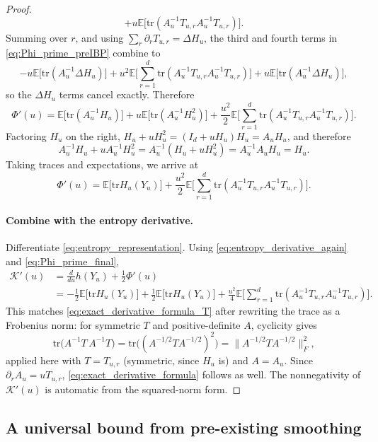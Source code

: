 \documentclass[11pt]{article}
\def\E{\mathbb{E}}
\newcommand{\tr}{\mathrm{tr}}
\begin{document}
\begin{proof}
\[+
 u\E\big[\tr(A_u^{-1}T_{u,r}A_u^{-1}T_{u,r})\big].
\]
Summing over \(r\), and using \(\sum_r \partial_r T_{u,r}=\Delta H_u\), the third and fourth terms in \eqref{eq:Phi_prime_preIBP} combine to
\[
-u\E\big[\tr(A_u^{-1}\Delta H_u)\big]
+
 u^2\E\Big[\sum_{r=1}^d \tr(A_u^{-1}T_{u,r}A_u^{-1}T_{u,r})\Big]
+
 u\E\big[\tr(A_u^{-1}\Delta H_u)\big],
\]
so the \(\Delta H_u\) terms cancel exactly. Therefore
\begin{equation}
\label{eq:Phi_prime_postIBP}
\Phi'(u)
=
\E\big[\tr(A_u^{-1}H_u)\big]
+
 u\E\big[\tr(A_u^{-1}H_u^2)\big]
+
 \frac{u^2}{2}
\E\Big[\sum_{r=1}^d \tr(A_u^{-1}T_{u,r}A_u^{-1}T_{u,r})\Big].
\end{equation}
Factoring \(H_u\) on the right, \(H_u+uH_u^2=(I_d+uH_u)H_u=A_u H_u\), and therefore
\[
A_u^{-1}H_u + uA_u^{-1}H_u^2 = A_u^{-1}(H_u+uH_u^2) = A_u^{-1}A_u H_u = H_u.
\]
Taking traces and expectations, we arrive at
\begin{equation}
\label{eq:Phi_prime_final}
\Phi'(u)
=
\E\big[\tr H_u(Y_u)\big]
+
\frac{u^2}{2}
\E\Big[\sum_{r=1}^d \tr(A_u^{-1}T_{u,r}A_u^{-1}T_{u,r})\Big].
\end{equation}

\paragraph{Combine with the entropy derivative.}
Differentiate \eqref{eq:entropy_representation}. Using \eqref{eq:entropy_derivative_again} and \eqref{eq:Phi_prime_final},
\begin{align*}
\mathcal K'(u)
&=
\frac{d}{du}h(Y_u) + \frac12\Phi'(u) \\
&=
-\frac12\E\big[\tr H_u(Y_u)\big]
+
\frac12\E\big[\tr H_u(Y_u)\big]
+
\frac{u^2}{4}
\E\Big[\sum_{r=1}^d \tr(A_u^{-1}T_{u,r}A_u^{-1}T_{u,r})\Big].
\end{align*}
This matches \eqref{eq:exact_derivative_formula_T} after rewriting the trace as a Frobenius norm: for symmetric \(T\) and positive-definite \(A\), cyclicity gives 
\[
\tr\big(A^{-1}T\,A^{-1}T\big)
=
\tr\big((A^{-1/2}T A^{-1/2})^2\big)
=
\big\|A^{-1/2}T A^{-1/2}\big\|_F^2,
\]
applied here with \(T=T_{u,r}\) (symmetric, since \(H_u\) is) and \(A=A_u\). Since \(\partial_r A_u=uT_{u,r}\), \eqref{eq:exact_derivative_formula} follows as well. The nonnegativity of \(\mathcal K'(u)\) is automatic from the squared-norm form. 
\end{proof}

\subsection{A universal bound from pre-existing smoothing}
\end{document}
